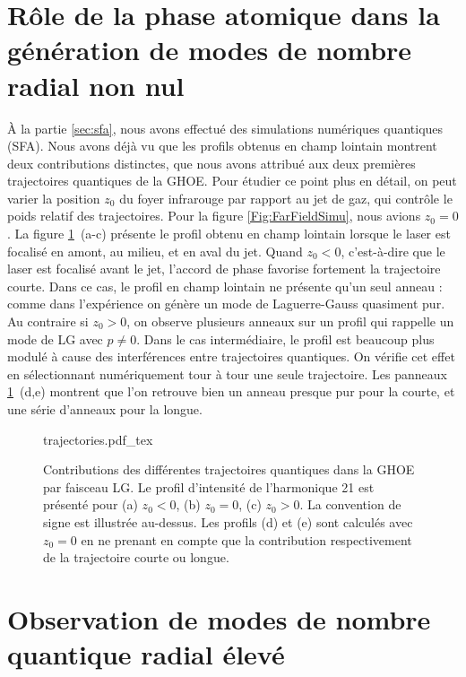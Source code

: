 \section{Rôle de la phase atomique dans la génération de modes de nombre radial non nul}
\`{A} la partie \ref{sec:sfa}, nous avons effectué des simulations numériques quantiques (SFA). Nous avons déjà vu que les profils obtenus en champ lointain montrent deux contributions distinctes, que nous avons attribué aux deux premières trajectoires quantiques de la GHOE. Pour étudier ce point plus en détail, on peut varier la position $z_0$ du foyer infrarouge par rapport au jet de gaz, qui contrôle le poids relatif des trajectoires. Pour la figure \ref{Fig:FarFieldSimu}, nous avions $z_0=0$. La figure \ref{Fig:H21_traj}~(a-c) présente le profil obtenu en champ lointain lorsque le laser est focalisé en amont, au milieu, et en aval du jet. Quand $z_0<0$, c'est-à-dire que le laser est focalisé avant le jet, l'accord de phase favorise fortement la trajectoire courte. Dans ce cas, le profil en champ lointain ne présente qu'un seul anneau : comme dans l'expérience on génère un mode de Laguerre-Gauss quasiment pur. Au contraire si $z_0>0$, on observe plusieurs anneaux sur un profil qui rappelle un mode de LG avec $p\neq 0$. Dans le cas intermédiaire, le profil est beaucoup plus modulé à cause des interférences entre trajectoires quantiques. On vérifie cet effet en sélectionnant numériquement tour à tour une seule trajectoire. Les panneaux \ref{Fig:H21_traj}~(d,e) montrent que l'on retrouve bien un anneau presque pur pour la courte, et une série d'anneaux pour la longue.

\begin{figure}[!ht]
\centering
\def\svgwidth{.7\columnwidth}
{trajectories.pdf_tex}
\caption{Contributions des différentes trajectoires quantiques dans la GHOE par faisceau LG. Le profil d'intensité de l'harmonique 21 est présenté pour (a) $z_0<0$, (b) $z_0=0$, (c) $z_0>0$. La convention de signe est illustrée au-dessus. Les profils (d) et (e) sont calculés avec $z_0=0$ en ne prenant en compte que la contribution respectivement de la trajectoire courte ou longue.}
\label{Fig:H21_traj}
\end{figure}

\section{Observation de modes de nombre quantique radial élevé}
